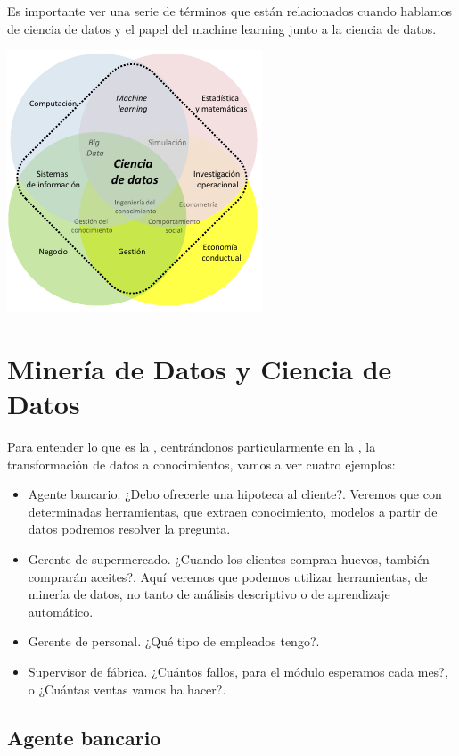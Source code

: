 Es importante ver una serie de términos que están relacionados cuando hablamos de ciencia de datos y el papel del machine learning junto a la ciencia de datos.

\begin{center}
    \includegraphics[scale=0.95]{images/mod01-02.png}
\end{center}

\section{Minería de Datos y Ciencia de Datos}

Para entender lo que es la , centrándonos particularmente en la , la transformación de datos a conocimientos, vamos a ver cuatro ejemplos:
\begin{itemize}
    \item Agente bancario. ¿Debo ofrecerle una hipoteca al cliente?. Veremos que con determinadas herramientas, que extraen conocimiento, modelos  a partir de datos podremos resolver la pregunta.
    \item Gerente de supermercado. ¿Cuando los clientes compran huevos, también comprarán aceites?. Aquí veremos que podemos utilizar herramientas, de minería de datos, no tanto de análisis descriptivo o de aprendizaje automático.
    \item Gerente de personal. ¿Qué tipo de empleados tengo?.
    \item Supervisor de fábrica. ¿Cuántos fallos, para el módulo  esperamos cada mes?, o ¿Cuántas ventas vamos ha hacer?.
\end{itemize}

\subsection{Agente bancario}

